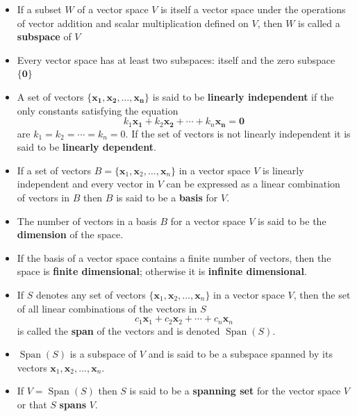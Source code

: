 \documentclass{article}
\newcommand{\Span}{\operatorname{Span}}
\begin{document}
\begin{itemize}
  \item If a subset $W$ of a vector space $V$ is itself a vector space under the operations of vector addition and scalar multiplication defined on $V$, then $W$ is called a \textbf{subspace} of $V$

  \item Every vector space has at least two subspaces: itself and the zero subspace $\{\mathbf{0}\}$

  \item A set of vectors $\{\mathbf{x_1}, \mathbf{x_2}, \ldots, \mathbf{x_n}\}$ is said to be \textbf{linearly independent} if the only constants satisfying the equation \[k_1 \mathbf{x_1} + k_2 \mathbf{x_2} + \cdots + k_n \mathbf{x_n} = \mathbf{0}\] are $k_1 = k_2 = \cdots = k_n = 0$. If the set of vectors is not linearly independent it is said to be \textbf{linearly dependent}.

  \item If a set of vectors $B = \{\mathbf{x}_1, \mathbf{x}_2, \ldots, \mathbf{x}_n\}$ in a vector space $V$ is linearly independent and every vector in $V$ can be expressed as a linear combination of vectors in $B$ then $B$ is said to be a \textbf{basis} for $V$.

  \item The number of vectors in a basis $B$ for a vector space $V$ is said to be the \textbf{dimension} of the space.

  \item If the basis of a vector space contains a finite number of vectors, then the space is \textbf{finite dimensional}; otherwise it is \textbf{infinite dimensional}.

  \item If $S$ denotes any set of vectors $\{\mathbf{x}_1, \mathbf{x}_2, \ldots, \mathbf{x}_n\}$ in a vector space $V$, then the set of all linear combinations of the vectors in $S$ \[c_1 \mathbf{x}_1 + c_2 \mathbf{x}_2 + \cdots + c_n \mathbf{x}_n\] is called the \textbf{span} of the vectors and is denoted $\Span(S)$.

  \item $\Span(S)$ is a subspace of $V$ and is said to be a subspace spanned by its vectors $\mathbf{x}_1, \mathbf{x}_2, \ldots, \mathbf{x}_n$.

  \item If $V = \Span(S)$ then $S$ is said to be a \textbf{spanning set} for the vector space $V$ or that $S$ \textbf{spans} $V$.
\end{itemize}
\end{document}
